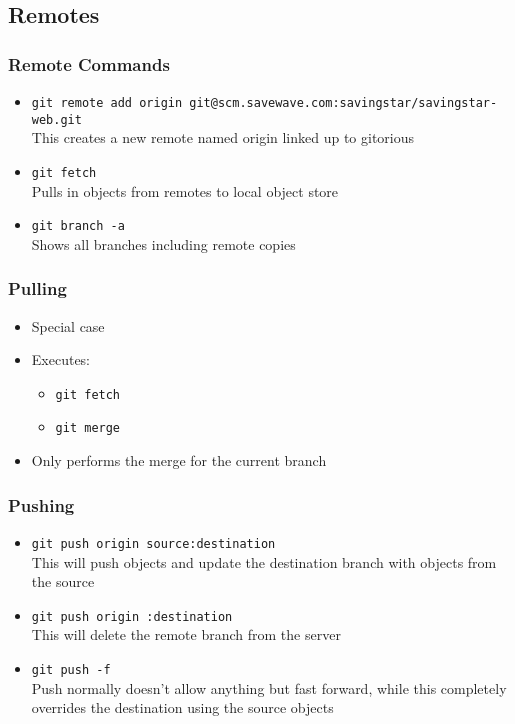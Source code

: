 \documentclass{beamer}
\begin{document}
\subsection{Remotes}

\begin{frame}
  \frametitle{Remote Commands}
  \begin{itemize}
  \item \texttt{git remote add origin git@scm.savewave.com:savingstar/savingstar-web.git}
    \\ This creates a new remote named origin linked up to gitorious
    \pause
  \item \texttt{git fetch}
    \\ Pulls in objects from remotes to local object store
    \pause
  \item \texttt{git branch -a}
    \\ Shows all branches including remote copies
  \end{itemize}
\end{frame}

\begin{frame}
  \frametitle{Pulling}
  \begin{itemize}
  \item Special case
  \item Executes:
    \begin{itemize}
    \item \texttt{git fetch}
    \item \texttt{git merge}
    \end{itemize}
  \item Only performs the merge for the current branch
  \end{itemize}
\end{frame}

\begin{frame}
  \frametitle{Pushing}
  \begin{itemize}
    \item \texttt{git push origin source:destination} \\ This will push objects
      and update the destination branch with objects from the source
      \pause
    \item \texttt{git push origin :destination} \\ This will delete the remote
      branch from the server
      \pause
    \item \texttt{git push -f} \\ Push normally doesn't allow anything but fast
      forward, while this completely overrides the destination using the source
      objects
  \end{itemize}
\end{frame}
\end{document}

